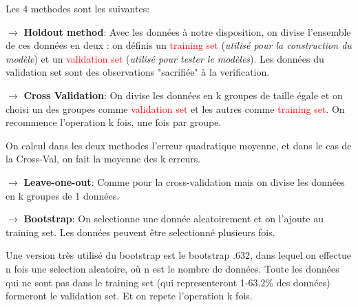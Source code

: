 \documentclass[a4paper, 11pt, onecolumn]{article}
\begin{document}
\begin{enumerate}
Les 4 methodes sont les suivantes:

$\rightarrow$ \textbf{Holdout method}: Avec les données à notre disposition, on divise l'ensemble de ces données en deux : on définis un \textcolor{red}{training set} (\textit{utilisé pour la construction du modèle}) et un \textcolor{red}{validation set} (\textit{utilisé pour tester le modèles}). Les données du validation set sont des observations "sacrifiée" à la verification.

$\rightarrow$ \textbf{Cross Validation}: On divise les données en k groupes de taille égale et on choisi un des groupes comme \textcolor{red}{validation set} et les autres comme \textcolor{red}{training set}. On recommence l'operation k fois, une fois par groupe. 

On calcul dans les deux methodes l'erreur quadratique moyenne, et dans le cas de la Cross-Val, on fait la moyenne des k erreurs.

$\rightarrow$ \textbf{Leave-one-out}: Comme pour la cross-validation mais on divise les données en k groupes de 1 données. 

$\rightarrow$ \textbf{Bootstrap}: On selectionne une donnée aleatoirement et on l'ajoute au training set. Les données peuvent être selectionné plusieurs fois. 

Une version très utilisé du bootstrap est le bootstrap .632, dans lequel on effectue n fois une selection aleatoire,  où n est le nombre de données.
Toute les données qui ne sont pas dans le training set (qui representeront 1-63.2\% des données) formeront le validation set.
Et on repete l'operation k fois.

\end{enumerate}
\end{document}
